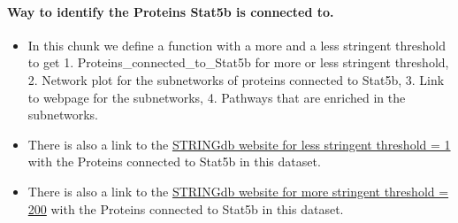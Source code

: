 \documentclass[
]{article}
\begin{document}
\hypertarget{way-to-identify-the-proteins-stat5b-is-connected-to.}{%
\paragraph{Way to identify the Proteins Stat5b is connected
to.}\label{way-to-identify-the-proteins-stat5b-is-connected-to.}}

\begin{itemize}
\item
  In this chunk we define a function with a more and a less stringent
  threshold to get 1. Proteins\_connected\_to\_Stat5b for more or less
  stringent threshold, 2. Network plot for the subnetworks of proteins
  connected to Stat5b, 3. Link to webpage for the subnetworks, 4.
  Pathways that are enriched in the subnetworks.
\item
  There is also a link to the
  \href{https://version-11-5.string-db.org/cgi/link?to=2E8CDC990DBD10F7}{STRINGdb
  website for less stringent threshold = 1} with the Proteins connected
  to Stat5b in this dataset.
\item
  There is also a link to the
  \href{https://version-11-5.string-db.org/cgi/link?to=18B5C3E16E9B3AE0}{STRINGdb
  website for more stringent threshold = 200} with the Proteins
  connected to Stat5b in this dataset.
\end{itemize}
\end{document}
